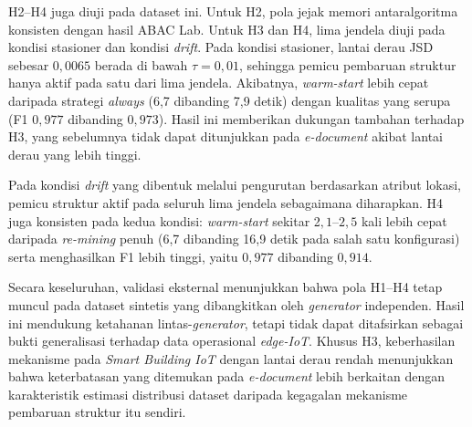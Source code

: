 H2–H4 juga diuji pada dataset ini. 
Untuk H2, pola jejak memori antaralgoritma konsisten dengan hasil ABAC Lab. 
Untuk H3 dan H4, lima jendela diuji pada kondisi stasioner dan kondisi \textit{drift}. 
Pada kondisi stasioner, lantai derau JSD sebesar $0,0065$ berada di bawah $\tau=0{,}01$, sehingga pemicu pembaruan struktur hanya aktif pada satu dari lima jendela. 
Akibatnya, \textit{warm-start} lebih cepat daripada strategi \textit{always} (6,7 dibanding 7,9 detik) dengan kualitas yang serupa (F1 $0,977$ dibanding $0,973$). 
Hasil ini memberikan dukungan tambahan terhadap H3, yang sebelumnya tidak dapat ditunjukkan pada \textit{e-document} akibat lantai derau yang lebih tinggi.

Pada kondisi \textit{drift} yang dibentuk melalui pengurutan berdasarkan atribut lokasi, pemicu struktur aktif pada seluruh lima jendela sebagaimana diharapkan. 
H4 juga konsisten pada kedua kondisi: \textit{warm-start} sekitar 2$,1$–$2,5$ kali lebih cepat daripada \textit{re-mining} penuh (6,7 dibanding 16,9 detik pada salah satu konfigurasi) serta menghasilkan F1 lebih tinggi, yaitu $0,977$ dibanding $0,914$.

Secara keseluruhan, validasi eksternal menunjukkan bahwa pola H1–H4 tetap muncul pada dataset sintetis yang dibangkitkan oleh \textit{generator} independen. 
Hasil ini mendukung ketahanan lintas-\textit{generator}, tetapi tidak dapat ditafsirkan sebagai bukti generalisasi terhadap data operasional \textit{edge-IoT}. 
Khusus H3, keberhasilan mekanisme pada \textit{Smart Building IoT} dengan lantai derau rendah menunjukkan bahwa keterbatasan yang ditemukan pada \textit{e-document} lebih berkaitan dengan karakteristik estimasi distribusi dataset daripada kegagalan mekanisme pembaruan struktur itu sendiri.